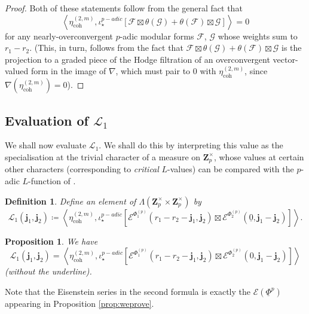 \documentclass[cjm]{ipart}
\theoremstyle{plain}
\newtheorem{proposition}[theorem]{Proposition}
\newtheorem{definition}[theorem]{Definition}
\theoremstyle{remark}
\DeclareMathOperator{\coh}{coh}
\newcommand{\Zp}{\mathbf{Z}_p}
\newcommand{\bfj}{\mathbf{j}}
\newcommand{\cE}{\mathcal{E}}
\newcommand{\cF}{\mathcal{F}}
\newcommand{\cG}{\mathcal{G}}
\newcommand{\sL}{\mathscr{L}}
\newcommand{\uPhi}{\underline{\Phi}}
\numberwithin{equation}{subsection}
\begin{document}
  \begin{proof}
   Both of these statements follow from the general fact that
   \begin{equation}
    \label{eq:thetatwist}
    \left\langle\eta^{(2,m)}_{\coh}, \iota^{p-adic}_\star\left[\cF\boxtimes \theta(\cG) +\theta(\cF) \boxtimes \cG \right]\right\rangle = 0
   \end{equation}
   for any nearly-overconvergent $p$-adic modular forms $\cF$, $\cG$ whose weights sum to $r_1 - r_2$. (This, in turn, follows from the fact that $\cF\boxtimes \theta(\cG) +\theta(\cF) \boxtimes \cG$ is the projection to a graded piece of the Hodge filtration of an overconvergent vector-valued form in the image of $\nabla$, which must pair to 0 with $\eta^{(2,m)}_{\coh}$, since $\nabla(\eta^{(2,m)}_{\coh}) = 0$).
  \end{proof}




 \subsection{Evaluation of $\sL_1$}
  \label{sect:evalL1}
  We shall now evaluate $\sL_1$. We shall do this by interpreting this value as the specialisation at the trivial character of a measure on $\Zp^\times$, whose values at certain other characters (corresponding to \emph{critical} $L$-values) can be compared with the $p$-adic $L$-function of \cite{LPSZ1}.

  \begin{definition}
   Define an element of $\Lambda(\Zp^\times \times \Zp^\times)$ by
   \[ \sL_1(\bfj_1, \bfj_2) \coloneqq \left\langle\eta^{(2,m)}_{\coh}, \iota^{p-adic}_\star\left[\cE^{\Phi_1^{(p)}}(r_1-r_2 - \bfj_1, \bfj_2)\boxtimes  \cE^{\Phi_2^{(p)}}(\underline{0},\bfj_1 - \bfj_2)\right]\right\rangle.\]
  \end{definition}

  \begin{proposition}
   We have
   \[ \sL_1(\bfj_1, \bfj_2) = \left\langle\eta^{(2,m)}_{\coh}, \iota^{p-adic}_\star\left[\cE^{\Phi_1^{(p)}}(r_1-r_2 - \bfj_1, \bfj_2)\boxtimes  \cE^{\Phi_2^{(p)}}(0,\bfj_1 - \bfj_2)\right]\right\rangle \]
   (without the underline).
  \end{proposition}

  Note that the Eisenstein series in the second formula is exactly the $\cE(\uPhi^p)$ appearing in Proposition \ref{prop:weprove}.
\end{document}
